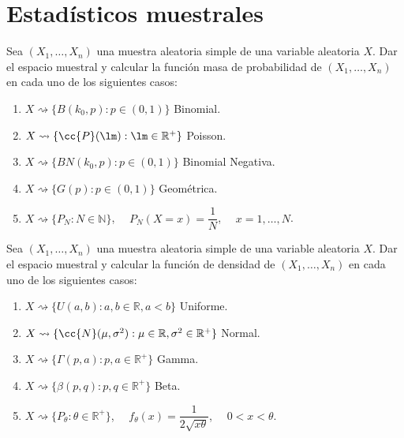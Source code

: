 \section{Estadísticos muestrales}

\begin{ejercicio}
    Sea $(X_1, \ldots, X_n)$ una muestra aleatoria simple de una variable aleatoria $X$. Dar el espacio muestral y calcular la función masa de probabilidad de $(X_1, \ldots, X_n)$ en cada uno de los siguientes casos:
    \begin{enumerate}[label=\alph*)]
        \item $X\rightsquigarrow \{B(k_0,p) : p\in (0,1)\}$ Binomial.
        \item $X\rightsquigarrow\{\cc{P}(\lm) : \lm \in \mathbb{R}^+\}$ Poisson.
        \item $X\rightsquigarrow\{BN(k_0,p) : p\in (0,1)\}$ Binomial Negativa.
        \item $X\rightsquigarrow\{G(p) : p\in (0,1)\}$ Geométrica.
        \item $X\rightsquigarrow\{P_N : N\in \mathbb{N}\}$, $\quad P_N(X=x) = \dfrac{1}{N}$, $\quad x=1,\ldots,N$.
    \end{enumerate}
\end{ejercicio}

\begin{ejercicio}
    Sea $(X_1, \ldots, X_n)$ una muestra aleatoria simple de una variable aleatoria $X$. Dar el espacio muestral y calcular la función de densidad de $(X_1, \ldots, X_n)$ en cada uno de los siguientes casos:
    \begin{enumerate}[label=\alph*)]
        \item $X\rightsquigarrow\{U(a,b) : a,b\in \mathbb{R}, a<b\}$ Uniforme.
        \item $X\rightsquigarrow\{\cc{N}(\mu, \sigma^2) : \mu \in \mathbb{R}, \sigma^2 \in \mathbb{R}^+\}$ Normal.
        \item $X\rightsquigarrow\{\Gamma(p,a) : p,a\in \mathbb{R}^+\}$ Gamma.
        \item $X\rightsquigarrow\{\beta(p,q) : p,q\in \mathbb{R}^+\}$ Beta.
        \item $X\rightsquigarrow\{P_\theta : \theta \in \mathbb{R}^+\}$, $\quad f_\theta(x) = \dfrac{1}{2\sqrt{x\theta}}$, $\quad 0<x<\theta$.
    \end{enumerate}
\end{ejercicio}

